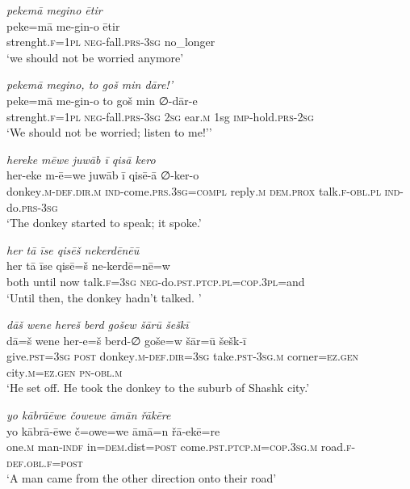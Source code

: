 \ea \label{HB.42}
\textit{pekemā megino ētir} \\ 
\gll peke=mā me-gin-o ētir \\ 
 strenght\textsc{\textsc{.f}}\textsc{=1pl} \textsc{neg-}fall\textsc{.prs}\textsc{-3sg} no\_longer \\ 
\glt `we should not be worried anymore'
\z 
 
\ea \label{HB.43}
\textit{pekemā megino, to goš min dāre!’} \\ 
\gll peke=mā me-gin-o to goš min ∅-dār-e \\ 
 strenght\textsc{\textsc{.f}}\textsc{=1pl} \textsc{neg-}fall\textsc{.prs}\textsc{-3sg} \textsc{2sg} ear\textsc{.m} 1sg \textsc{imp-}hold\textsc{.prs}-\textsc{2sg} \\ 
\glt `We should not be worried; listen to me!’'
\z 
 
\ea \label{HB.44}
\textit{hereke mēwe juwāb ī qisā kero} \\ 
\gll her-eke m-ē=we juwāb ī qisē-ā ∅-ker-o \\ 
 donkey\textsc{.m}\textsc{-def}\textsc{.dir}\textsc{.m} \textsc{ind-}come\textsc{.prs}\textsc{.3sg}\textsc{=compl} reply\textsc{.m} \textsc{dem.prox} talk\textsc{\textsc{.f}}\textsc{-obl}\textsc{.pl} \textsc{ind-}do\textsc{.prs}\textsc{-3sg} \\ 
\glt `The donkey started to speak; it spoke.'
\z 
 
\ea \label{HB.46}
\textit{her tā īse qisēš nekerdēnēū} \\ 
\gll her tā īse qisē=š ne-kerdē=nē=w \\ 
 both until now talk\textsc{\textsc{.f}}\textsc{=3sg} \textsc{neg-}do\textsc{.pst}\textsc{.ptcp}\textsc{.pl}\textsc{=cop}\textsc{.3pl}=and \\ 
\glt `Until then, the donkey hadn’t talked. '
\z 
 
\ea \label{HB.48}
\textit{dāš wene hereš berd gošew šārū šeškī} \\ 
\gll dā=š wene her-e=š berd-∅ goše=w šār=ū šešk-ī \\ 
 give\textsc{.pst}\textsc{=3sg} \textsc{post} donkey\textsc{.m}\textsc{-def}\textsc{.dir}\textsc{=3sg} take\textsc{.pst}\textsc{-3sg}\textsc{.m} corner\textsc{=ez}\textsc{.gen} city\textsc{.m}\textsc{=ez}\textsc{.gen} \textsc{pn}\textsc{-obl}\textsc{.m} \\ 
\glt `He set off. He took the donkey to the suburb of Shashk city.'
\z 
 
\ea \label{HB.49}
\textit{yo kābrāēwe čowewe āmān řākēre} \\ 
\gll yo kābrā-ēwe č=owe=we āmā=n řā-ekē=re \\ 
 one\textsc{.m} man\textsc{-indf} in\textsc{=dem}.dist\textsc{=\textsc{post}} come\textsc{.pst}\textsc{.ptcp}\textsc{.m}\textsc{=cop}\textsc{.3sg}\textsc{.m} road\textsc{\textsc{.f}}\textsc{-def}\textsc{.obl}\textsc{\textsc{.f}}\textsc{=\textsc{post}} \\ 
\glt `A man came from the other direction onto their road'
\z 
 
